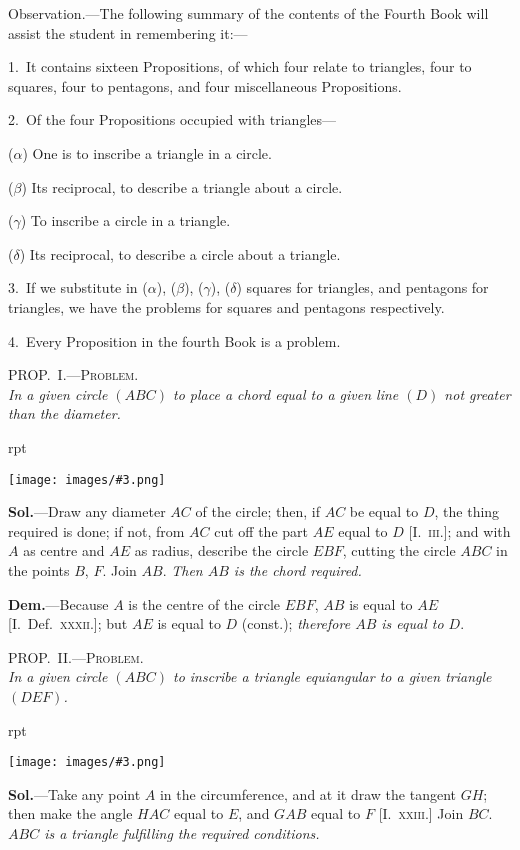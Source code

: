 \documentclass[oneside]{book}
\newcounter{wrapwidth}
\newcommand\myprop[2]{
\bigskip\Needspace*{4\baselineskip}\begin{center}\textsc{#1}\\\medskip\emph{#2}\par\end{center}
}
\newcommand\imgflow[3]{
\setcounter{wrapwidth}{#1}
\begin{wrapfigure}[#2]{r}{\value{wrapwidth}pt}
\begin{center}
\vspace{-0.3in}
\texttt{[image: images/\#3.png]}
\end{center}
\end{wrapfigure}
}
\begin{document}
\begin{footnotesize}
\textsf{Observation.}---The following summary of the contents of the
Fourth Book will assist the student in remembering it:---

1.~It contains sixteen Propositions, of which four relate to
triangles, four to squares, four to pentagons, and four miscellaneous
Propositions.

2.~Of the four Propositions occupied with triangles---

($\alpha$) One is to inscribe a triangle in a circle.

($\beta$) Its reciprocal, to describe a triangle about a circle.

($\gamma$) To inscribe a circle in a triangle.

($\delta$) Its reciprocal, to describe a circle about a triangle.

3.~If we substitute in ($\alpha$), ($\beta$), ($\gamma$), ($\delta$) squares for triangles,
and pentagons for triangles, we have the problems for squares
and pentagons respectively.

4.~Every Proposition in the fourth Book is a problem.
\par\end{footnotesize}

\myprop{PROP\@.~I.---Problem.}{In a given circle $(ABC)$ to place a chord equal to a given
line $(D)$ not greater than the diameter.}

\imgflow{180}{9}{f151}

\textbf{Sol.}---Draw any diameter $AC$ of the circle; then, if
$AC$ be equal to $D$,
the thing required is
done; if not, from $AC$
cut off the part $AE$
equal to $D$ [I.~\textsc{iii.}];
and with $A$ as centre
and $AE$ as radius, describe
the circle $EBF$,
cutting the circle $ABC$
in the points $B$, $F$. Join $AB$. \textit{Then $AB$ is the chord
required.}

\textbf{Dem.}---Because $A$ is the centre of the circle $EBF$,
$AB$ is equal to $AE$ [I.~Def.~\textsc{xxxii.}]; but $AE$ is equal
to $D$ (const.); \emph{therefore $AB$ is equal to $D$}.

\myprop{PROP\@.~II\@.---Problem.}{In a given circle $(ABC)$ to inscribe a triangle equiangular
to a given triangle $(DEF)$.}

\imgflow{170}{9}{f152}

\textbf{Sol.}---Take any point $A$ in the circumference, and
at it draw the tangent
$GH$; then make the
angle $HAC$ equal to
$E$, and $GAB$ equal to
$F$ [I.~\textsc{xxiii.}] Join $BC$.
\textit{$ABC$ is a triangle fulfilling
the required conditions.}
\end{document}
